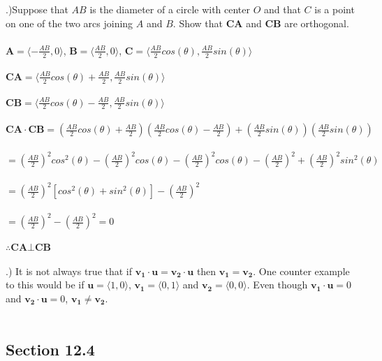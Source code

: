 \documentclass[12pt]{article}
\begin{document}
.)Suppose that $AB$ is the diameter of a circle with center $O$ and that $C$ is a point on one of the two arcs joining $A$ and $B$. Show that $\mathbf{CA}$ and $\mathbf{CB}$ are orthogonal.\\\\
$\mathbf{A} = \langle -\frac{AB}{2}, 0\rangle$, \hspace{10pt}
$\mathbf{B} = \langle \frac{AB}{2}, 0\rangle$, \hspace{10pt}
$\mathbf{C} = \langle \frac{AB}{2}cos(\theta), \frac{AB}{2}sin(\theta) \rangle$\\\\
$\mathbf{CA} = \langle \frac{AB}{2}cos(\theta) + \frac{AB}{2}, \frac{AB}{2}sin(\theta)\rangle$\\\\
$\mathbf{CB} = \langle \frac{AB}{2}cos(\theta) - \frac{AB}{2}, \frac{AB}{2}sin(\theta)\rangle$\\\\
$\mathbf{CA \cdot CB} = (\frac{AB}{2}cos(\theta) + \frac{AB}{2})(\frac{AB}{2}cos(\theta) - \frac{AB}{2}) + (\frac{AB}{2}sin(\theta))(\frac{AB}{2}sin(\theta))$\\\\
$=(\frac{AB}{2})^{2}cos^{2}(\theta)-(\frac{AB}{2})^{2}cos(\theta) - (\frac{AB}{2})^{2}cos(\theta)-(\frac{AB}{2})^{2} + (\frac{AB}{2})^{2}sin^{2}(\theta)$\\\\
$=(\frac{AB}{2})^{2}[cos^{2}(\theta)+sin^{2}(\theta)] - (\frac{AB}{2})^{2}$\\\\
$= (\frac{AB}{2})^{2} - (\frac{AB}{2})^{2} = 0$\\\\
$\therefore \mathbf{CA} \bot \mathbf{CB}$\\\\ 

.) 
It is not always true that if $\mathbf{v_{1}\cdot u} = \mathbf{v_{2} \cdot u}$ then $\mathbf{v_{1}} = \mathbf{v_{2}}$. One counter example to this would be if $\mathbf{u} = \langle 1, 0\rangle$, $\mathbf{v_{1}} = \langle 0, 1\rangle$ and $\mathbf{v_{2}} = \langle 0, 0\rangle$. Even though $\mathbf{v_{1} \cdot u} = 0$ and $\mathbf{v_{2} \cdot u} = 0$, $\mathbf{v_{1}} \neq \mathbf{v_{2}}$. \\\\

\pagebreak
\subsection*{Section 12.4}
\end{document}
